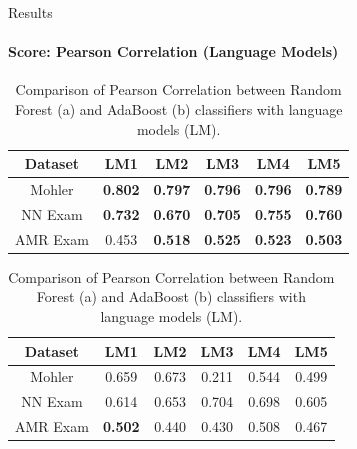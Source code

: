 \documentclass[aspectratio=169]{beamer}
\begin{document}
\begin{frame}{Results}
\framesubtitle{Score: Pearson Correlation (Language Models)}
\noindent
\begin{table}
	\noindent
	\begin{subtable}[c]{0.7\textwidth}
		\noindent
		\centering
		\begin{tabular}{|c|c|c|c|c|c|}
			\hline
			Dataset & LM1 & LM2 & LM3 & LM4 & LM5 \\
			\hline
			Mohler &\textbf{0.802}& \textbf{0.797}& \textbf{0.796}& \textbf{0.796}& \textbf{0.789}\\
			\hline
			NN Exam &\textbf{0.732}& \textbf{0.670}& \textbf{0.705}& \textbf{0.755}& \textbf{0.760}\\
			\hline
			AMR Exam &0.453& \textbf{0.518}& \textbf{0.525}& \textbf{0.523}& \textbf{0.503}\\
			\hline
		\end{tabular}
		\subcaption{}
	\end{subtable}
	\begin{subtable}[c]{0.7\textwidth}
		\centering
		\begin{tabular}{|c|c|c|c|c|c|}
			\hline
			Dataset & LM1 & LM2 & LM3 & LM4 & LM5 \\
			\hline
			Mohler &0.659& 0.673& 0.211& 0.544& 0.499 \\
			\hline
			NN Exam &0.614& 0.653& 0.704& 0.698& 0.605\\
			\hline
			AMR Exam &\textbf{0.502}& 0.440& 0.430& 0.508& 0.467\\
			\hline
		\end{tabular}	
		\subcaption{}
	\end{subtable}
	\caption{Comparison of Pearson Correlation between Random Forest (a) and AdaBoost (b) classifiers with language models (LM).}
\end{table}
\end{frame}
\end{document}
